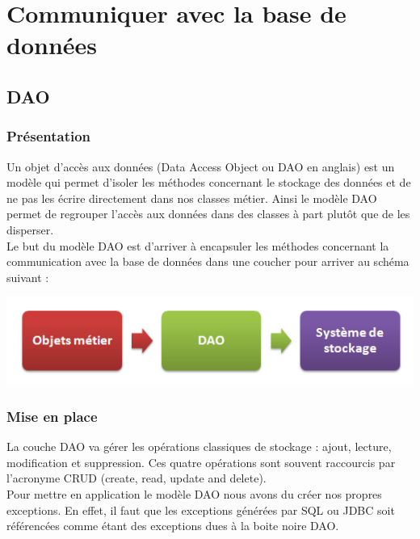 \section{Communiquer avec la base de données}

\subsection{DAO}

\subsubsection{Présentation}
Un objet d'accès aux données (Data Access Object ou DAO en anglais) est un modèle qui permet d'isoler les méthodes concernant le stockage des données et de ne pas les écrire directement dans nos classes métier. Ainsi le modèle DAO permet de regrouper l'accès aux données dans des classes à part plutôt que de les disperser. \\

Le but du modèle DAO est d'arriver à encapsuler les méthodes concernant la communication avec la base de données dans une coucher pour arriver au schéma suivant :

\begin{center}
\includegraphics[scale=0.5]{../graph/dao1.png} \\
\end{center}

\subsubsection{Mise en place}
La couche DAO va gérer les opérations classiques de stockage : ajout, lecture, modification et suppression. Ces quatre opérations sont souvent raccourcis par l'acronyme CRUD (create, read, update and delete). \\

Pour mettre en application le modèle DAO nous avons du créer nos propres exceptions. En effet, il faut que les exceptions générées par SQL ou JDBC soit référencées comme étant des exceptions dues à la boite noire DAO. 

